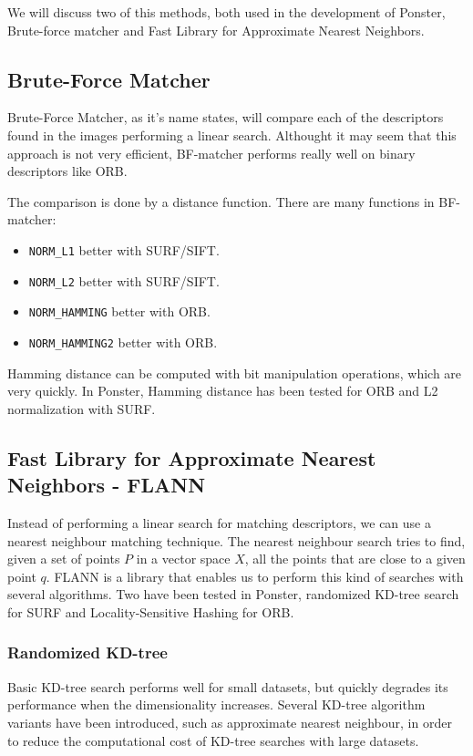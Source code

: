 We will discuss two of this methods, both used in the development of Ponster,
Brute-force matcher and Fast Library for Approximate Nearest Neighbors. 

\subsection{Brute-Force Matcher}
Brute-Force Matcher, as it's name states, will compare each of the descriptors
found in the images performing a linear search. Althought it may seem that this approach is not very
efficient, BF-matcher performs really well on binary descriptors like ORB.

The comparison is done by a distance function. There are many functions in
BF-matcher:
\begin{itemize}
\item \texttt{NORM\_L1} better with SURF/SIFT.
\item \texttt{NORM\_L2} better with SURF/SIFT.
\item \texttt{NORM\_HAMMING} better with ORB.
\item \texttt{NORM\_HAMMING2} better with ORB.
\end{itemize}
Hamming distance can be computed with bit manipulation operations, which are
very quickly. In Ponster, Hamming distance has been tested for ORB and L2
normalization with SURF. 

\subsection{Fast Library for Approximate Nearest Neighbors - FLANN}
Instead of performing a linear search for matching descriptors, we can use a
nearest neighbour matching technique. The nearest neighbour search tries to
find, given a set of points $P$ in a vector space $X$, all the points that are 
close to a given point $q$. FLANN\cite{muja:fast}
is a library that enables us to perform this
kind of searches with several algorithms. Two have been tested in Ponster,
randomized KD-tree search for SURF and Locality-Sensitive Hashing for ORB.

\subsubsection{Randomized KD-tree}
Basic KD-tree search performs well for small datasets, but quickly degrades
its performance when the dimensionality increases. Several KD-tree algorithm
variants have been introduced, such as approximate nearest neighbour, in order
to reduce the computational cost of KD-tree searches with large datasets. 

